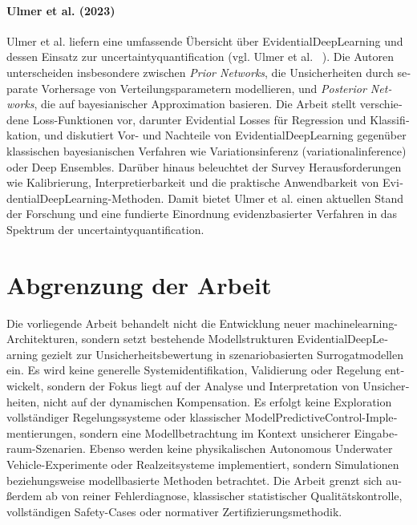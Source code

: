 

\begin{otherlanguage}{ngerman}

\paragraph{Ulmer et al. (2023)} Ulmer et al. liefern eine umfassende Übersicht über \gls{EvidentialDeepLearning} und dessen Einsatz zur \gls{uncertaintyquantification} (vgl. Ulmer et al. ~\parencite{Ulmer2023}). Die Autoren unterscheiden insbesondere zwischen \emph{Prior Networks}, die Unsicherheiten durch separate Vorhersage von Verteilungsparametern modellieren, und \emph{Posterior Networks}, die auf bayesianischer Approximation basieren. Die Arbeit stellt verschiedene Loss-Funktionen vor, darunter Evidential Losses für Regression und Klassifikation, und diskutiert Vor- und Nachteile von \gls{EvidentialDeepLearning} gegenüber klassischen bayesianischen Verfahren wie Variationsinferenz (\gls{variationalinference}) oder Deep Ensembles. Darüber hinaus beleuchtet der Survey Herausforderungen wie Kalibrierung, Interpretierbarkeit und die praktische Anwendbarkeit von \gls{EvidentialDeepLearning}-Methoden. Damit bietet Ulmer et al. einen aktuellen Stand der Forschung und eine fundierte Einordnung evidenzbasierter Verfahren in das Spektrum der \gls{uncertaintyquantification}. 

\section{Abgrenzung der Arbeit}

Die vorliegende Arbeit behandelt nicht die Entwicklung neuer \gls{machinelearning}-Architekturen, sondern setzt bestehende Modellstrukturen \gls{EvidentialDeepLearning} gezielt zur Unsicherheitsbewertung in szenariobasierten Surrogatmodellen ein. Es wird keine generelle Systemidentifikation, Validierung oder Regelung entwickelt, sondern der Fokus liegt auf der Analyse und Interpretation von Unsicherheiten, nicht auf der dynamischen Kompensation.
Es erfolgt keine Exploration vollständiger Regelungssysteme oder klassischer \gls{ModelPredictiveControl}-Implementierungen, sondern eine Modellbetrachtung im Kontext unsicherer Eingaberaum-Szenarien. Ebenso werden keine physikalischen \gls{Autonomous Underwater Vehicle}-Experimente oder Realzeitsysteme implementiert, sondern Simulationen beziehungsweise modellbasierte Methoden betrachtet. Die Arbeit grenzt sich außerdem ab von reiner Fehlerdiagnose, klassischer statistischer Qualitätskontrolle, vollständigen Safety-Cases oder normativer Zertifizierungsmethodik. %



\end{otherlanguage}
